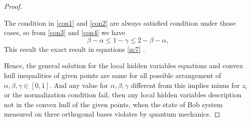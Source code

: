 \begin{proof}
\begin{itemize}
The condition in \ref{con1} and \ref{con2} are  always satisfied condition under those cases, so from \ref{con3} and \ref{con4} we have
\begin{equation}
\beta-\alpha \leq 1-\gamma \leq 2-\beta-\alpha, 
\end{equation}
This result the exact result in equations \ref{zc7} .
\end{itemize}
Hence, the general solution for the local hidden variables equations  and convex hull inequalities of given points are same for  all possible arrangement of $\alpha, \beta , \gamma \in [0,1]$. And any value for $\alpha, \beta , \gamma$ different from this implies minus for $z_i$ or the normalization condition fail, then any local hidden variables description not in the convex hull of the given points, when the state of Bob system measured on three orthogonal bases  violates by  quantum mechanics.
\end{proof}